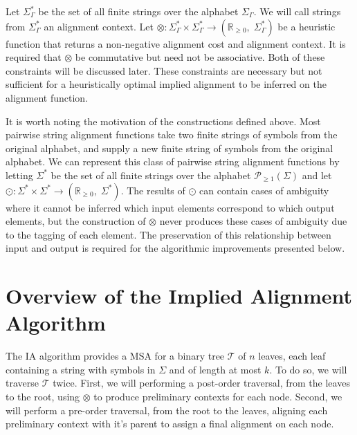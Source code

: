 \documentclass{bmcart}
\newcommand*\NEPowerset{\mathcal{P}_{\geq 1}}
\newcommand*\NonNegReals{\mathbb{R}_{\geq 0}}
\begin{document}
Let $\Sigma^{*}_{\Gamma}$ be the set of all finite strings over the alphabet $\Sigma_{\Gamma}$.
We will call strings from $\Sigma^{*}_{\Gamma}$ an alignment context.
Let $\otimes : \Sigma^{*}_{\Gamma} \times \Sigma^{*}_{\Gamma} \rightarrow \left(\NonNegReals,\; \Sigma^{*}_{\Gamma}\right)$ be a heuristic function that returns a non-negative alignment cost and alignment context.
It is required that $\otimes$ be commutative but need not be associative.
Both of these constraints will be discussed later.
These constraints are necessary but not sufficient for a heuristically optimal implied alignment to be inferred on the alignment function.

It is worth noting the motivation of the constructions defined above. 
Most pairwise string alignment functions take two finite strings of symbols from the original alphabet, and supply a new finite string of symbols from the original alphabet.
We can represent this class of pairwise string alignment functions by letting $\Sigma^{*}$ be the set of all finite strings over the alphabet $\NEPowerset (\Sigma)$ and let $\odot: \Sigma^{*} \times \Sigma^{*} \rightarrow \left(\NonNegReals,\; \Sigma^{*} \right)$.
The results of $\odot$ can contain cases of ambiguity where it cannot be inferred which input elements correspond to which output elements, but the construction of $\otimes$ never produces these cases of ambiguity due to the tagging of each element.
The preservation of this relationship between input and output is required for the algorithmic improvements presented below.


\section*{Overview of the Implied Alignment Algorithm}

The IA algorithm provides a MSA for a binary tree $\mathcal{T}$ of $n$ leaves, each leaf containing a string with symbols in $\Sigma$ and of length at most $k$.
To do so, we will traverse $\mathcal{T}$ twice.
First, we will performing a post-order traversal, from the leaves to the root, using $\otimes$ to produce preliminary contexts for each node. 
Second, we will perform a pre-order traversal, from the root to the leaves, aligning each preliminary context with it's parent to assign a final alignment on each node.
\end{document}
